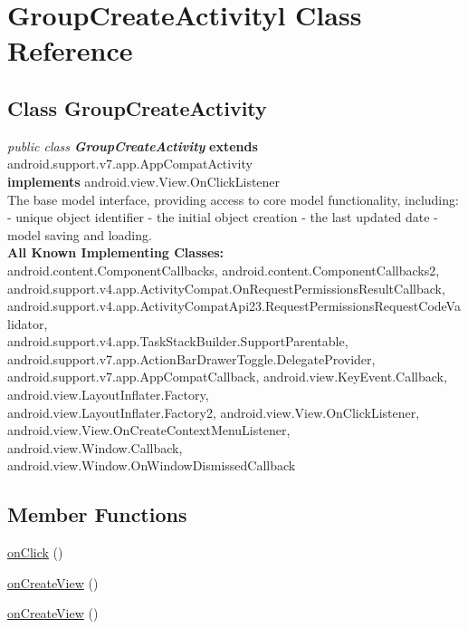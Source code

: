 \hypertarget{class_GroupCreateActivity.Android}{\section{GroupCreateActivityl Class Reference}
\label{class_GroupCreateActivity.Android}
}

\subsection*{Class GroupCreateActivity}

\textit{public class \textbf{GroupCreateActivity}}
\textbf{extends} android.support.v7.app.AppCompatActivity\\
\textbf{implements} android.view.View.OnClickListener\\

The base model interface, providing access to core model functionality, including: - unique object identifier - the initial object creation - the last updated date - model saving and loading.\\


\textbf{All Known Implementing Classes:}\\
\tab            android.content.ComponentCallbacks, android.content.ComponentCallbacks2,\\
android.support.v4.app.ActivityCompat.OnRequestPermissionsResultCallback, \\
android.support.v4.app.ActivityCompatApi23.RequestPermissionsRequestCodeValidator,\\
 android.support.v4.app.TaskStackBuilder.SupportParentable, android.support.v7.app.ActionBarDrawerToggle.DelegateProvider,\\
  android.support.v7.app.AppCompatCallback, android.view.KeyEvent.Callback, android.view.LayoutInflater.Factory,\\
   android.view.LayoutInflater.Factory2, android.view.View.OnClickListener, android.view.View.OnCreateContextMenuListener,\\
    android.view.Window.Callback, android.view.Window.OnWindowDismissedCallback\\



\subsection*{Member Functions}
\begin{DoxyCompactItemize}
\item 
\hyperlink{class_GroupCreateActivity.Android.onClick}{onClick} ()
\item 
\hyperlink{class_GroupCreateActivity.Android.onCreateView}{onCreateView} ()
\item 
\hyperlink{class_GroupCreateActivity.Android.onCreateView2}{onCreateView} ()

\end{DoxyCompactItemize}




